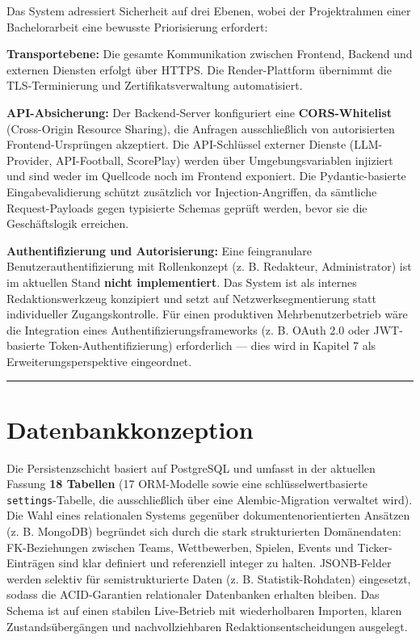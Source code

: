 Das System adressiert Sicherheit auf drei Ebenen, wobei der
Projektrahmen einer Bachelorarbeit eine bewusste Priorisierung
erfordert:

\textbf{Transportebene:} Die gesamte Kommunikation zwischen Frontend,
Backend und externen Diensten erfolgt über HTTPS. Die Render-Plattform
übernimmt die TLS-Terminierung und Zertifikatsverwaltung automatisiert.

\textbf{API-Absicherung:} Der Backend-Server konfiguriert eine
\textbf{CORS-Whitelist} (Cross-Origin Resource Sharing), die Anfragen
ausschließlich von autorisierten Frontend-Ursprüngen akzeptiert. Die
API-Schlüssel externer Dienste (LLM-Provider, API-Football, ScorePlay)
werden über Umgebungsvariablen injiziert und sind weder im Quellcode
noch im Frontend exponiert. Die Pydantic-basierte Eingabevalidierung
schützt zusätzlich vor Injection-Angriffen, da sämtliche
Request-Payloads gegen typisierte Schemas geprüft werden, bevor sie die
Geschäftslogik erreichen.

\textbf{Authentifizierung und Autorisierung:} Eine feingranulare
Benutzerauthentifizierung mit Rollenkonzept (z. B. Redakteur,
Administrator) ist im aktuellen Stand \textbf{nicht implementiert}. Das
System ist als internes Redaktionswerkzeug konzipiert und setzt auf
Netzwerksegmentierung statt individueller Zugangskontrolle. Für einen
produktiven Mehrbenutzerbetrieb wäre die Integration eines
Authentifizierungsframeworks (z. B. OAuth 2.0 oder JWT-basierte
Token-Authentifizierung) erforderlich --- dies wird in Kapitel 7 als
Erweiterungsperspektive eingeordnet.

\begin{center}\rule{0.5\linewidth}{0.5pt}\end{center}

\section{Datenbankkonzeption}\label{datenbankkonzeption}

Die Persistenzschicht basiert auf PostgreSQL und umfasst in der
aktuellen Fassung \textbf{18 Tabellen} (17 ORM-Modelle sowie eine
schlüsselwertbasierte \texttt{settings}-Tabelle, die ausschließlich über
eine Alembic-Migration verwaltet wird). Die Wahl eines relationalen
Systems gegenüber dokumentenorientierten Ansätzen (z. B. MongoDB)
begründet sich durch die stark strukturierten Domänendaten:
FK-Beziehungen zwischen Teams, Wettbewerben, Spielen, Events und
Ticker-Einträgen sind klar definiert und referenziell integer zu halten.
JSONB-Felder werden selektiv für semistrukturierte Daten (z. B.
Statistik-Rohdaten) eingesetzt, sodass die ACID-Garantien relationaler
Datenbanken erhalten bleiben. Das Schema ist auf einen stabilen
Live-Betrieb mit wiederholbaren Importen, klaren Zustandsübergängen und
nachvollziehbaren Redaktionsentscheidungen ausgelegt.

